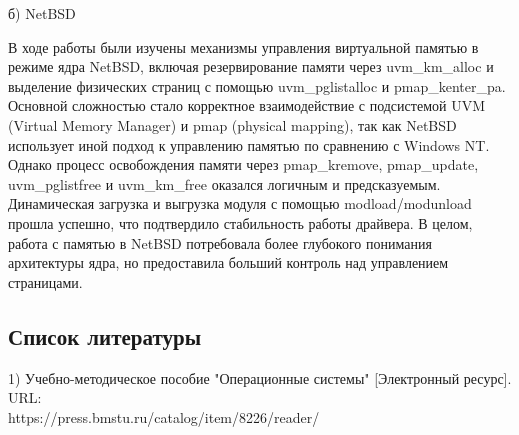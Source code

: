 \documentclass[a4paper, 14pt]{extarticle}
\begin{document}
\begin{center}
б) NetBSD
\end{center}
В ходе работы были изучены механизмы управления виртуальной памятью в режиме ядра NetBSD, включая резервирование памяти через uvm\_km\_alloc и выделение физических страниц с помощью uvm\_pglistalloc и pmap\_kenter\_pa. Основной сложностью стало корректное взаимодействие с подсистемой UVM (Virtual Memory Manager) и pmap (physical mapping), так как NetBSD использует иной подход к управлению памятью по сравнению с Windows NT. Однако процесс освобождения памяти через pmap\_kremove, pmap\_update, uvm\_pglistfree и uvm\_km\_free оказался логичным и предсказуемым. Динамическая загрузка и выгрузка модуля с помощью modload/modunload прошла успешно, что подтвердило стабильность работы драйвера. В целом, работа с памятью в NetBSD потребовала более глубокого понимания архитектуры ядра, но предоставила больший контроль над управлением страницами.



\begin{center}
\section{Список литературы}
\end{center}
1) Учебно-методическое пособие "Операционные системы" [Электронный ресурс]. URL:\\
https://press.bmstu.ru/catalog/item/8226/reader/\\
\end{document}
